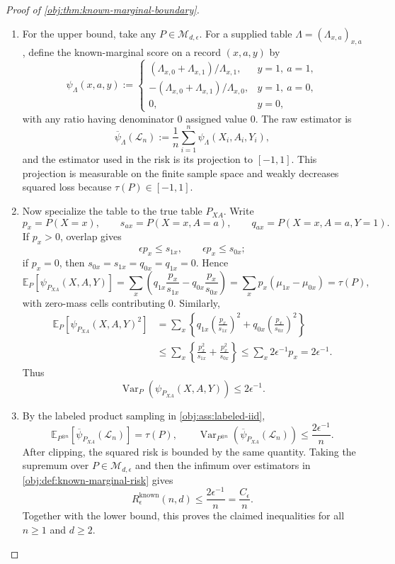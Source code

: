 \documentclass[11pt]{article}
\begin{document}
\begin{proof}[Proof of \cref{obj:thm:known-marginal-boundary}]
\begin{enumerate}
\item
For the upper bound, take any \(P\in\mathcal M_{d,\epsilon}\).  For a supplied table \(\Lambda=(\Lambda_{x,a})_{x,a}\), define the known-marginal score on a record \((x,a,y)\) by
\[
\psi_{\Lambda}(x,a,y)
:=
\begin{cases}
(\Lambda_{x,0}+\Lambda_{x,1})/\Lambda_{x,1}, & y=1,\ a=1,\\
-(\Lambda_{x,0}+\Lambda_{x,1})/\Lambda_{x,0}, & y=1,\ a=0,\\
0, & y=0,
\end{cases}
\]
with any ratio having denominator \(0\) assigned value \(0\).  The raw estimator is
\[
\overline\psi_{\Lambda}(\mathcal L_n)
:=
\frac1n\sum_{i=1}^n \psi_{\Lambda}(X_i,A_i,Y_i),
\]
and the estimator used in the risk is its projection to \([-1,1]\).  This projection is measurable on the finite sample space and weakly decreases squared loss because \(\tau(P)\in[-1,1]\). %

\item
Now specialize the table to the true table \(P_{XA}\).  Write
\[
p_x=P(X=x),\qquad
s_{ax}=P(X=x,A=a),\qquad
q_{ax}=P(X=x,A=a,Y=1).
\]
If \(p_x>0\), overlap gives
\[
\epsilon p_x\le s_{1x},
\qquad
\epsilon p_x\le s_{0x};
\]
if \(p_x=0\), then \(s_{0x}=s_{1x}=q_{0x}=q_{1x}=0\).  Hence
\[
\mathbb E_P[\psi_{P_{XA}}(X,A,Y)]
=
\sum_x\left(q_{1x}\frac{p_x}{s_{1x}}-q_{0x}\frac{p_x}{s_{0x}}\right)
=
\sum_x p_x(\mu_{1x}-\mu_{0x})
=
\tau(P),
\]
with zero-mass cells contributing \(0\).  Similarly,
\[
\begin{aligned}
\mathbb E_P[\psi_{P_{XA}}(X,A,Y)^2]
&=
\sum_x\left\{
q_{1x}\left(\frac{p_x}{s_{1x}}\right)^2
+
q_{0x}\left(\frac{p_x}{s_{0x}}\right)^2
\right\} \\
&\le
\sum_x\left\{
\frac{p_x^2}{s_{1x}}
+
\frac{p_x^2}{s_{0x}}
\right\}
\le
\sum_x 2\epsilon^{-1}p_x
=
2\epsilon^{-1}.
\end{aligned}
\]
Thus
\[
\operatorname{Var}_P\!\left(\psi_{P_{XA}}(X,A,Y)\right)
\le 2\epsilon^{-1}.
\]

\item
By the labeled product sampling in \cref{obj:ass:labeled-iid},
\[
\mathbb E_{P^{\otimes n}}\!\left[\overline\psi_{P_{XA}}(\mathcal L_n)\right]
=\tau(P),
\qquad
\operatorname{Var}_{P^{\otimes n}}\!\left(\overline\psi_{P_{XA}}(\mathcal L_n)\right)
\le
\frac{2\epsilon^{-1}}{n}.
\]
After clipping, the squared risk is bounded by the same quantity.  Taking the supremum over \(P\in\mathcal M_{d,\epsilon}\) and then the infimum over estimators in \cref{obj:def:known-marginal-risk} gives
\[
R_\epsilon^{\mathrm{known}}(n,d)
\le
\frac{2\epsilon^{-1}}{n}
=
\frac{C_\epsilon}{n}.
\]
Together with the lower bound, this proves the claimed inequalities for all \(n\ge1\) and \(d\ge2\). %
\end{enumerate}
\end{proof}
\end{document}
